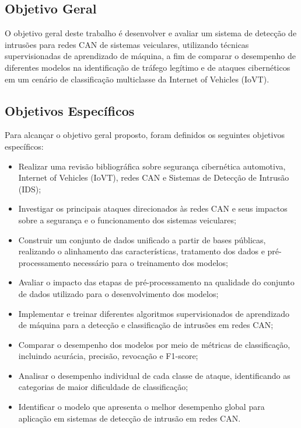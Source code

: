 \subsection{Objetivo Geral}

O objetivo geral deste trabalho é desenvolver e avaliar um sistema de detecção de intrusões para redes CAN de sistemas veiculares, utilizando técnicas supervisionadas de aprendizado de máquina, a fim de comparar o desempenho de diferentes modelos na identificação de tráfego legítimo e de ataques cibernéticos em um cenário de classificação multiclasse da Internet of Vehicles (IoVT).

\subsection{Objetivos Específicos}

Para alcançar o objetivo geral proposto, foram definidos os seguintes objetivos específicos:

\begin{itemize}

\item Realizar uma revisão bibliográfica sobre segurança cibernética automotiva, Internet of Vehicles (IoVT), redes CAN e Sistemas de Detecção de Intrusão (IDS);

\item Investigar os principais ataques direcionados às redes CAN e seus impactos sobre a segurança e o funcionamento dos sistemas veiculares;

\item Construir um conjunto de dados unificado a partir de bases públicas, realizando o alinhamento das características, tratamento dos dados e pré-processamento necessário para o treinamento dos modelos;

\item Avaliar o impacto das etapas de pré-processamento na qualidade do conjunto de dados utilizado para o desenvolvimento dos modelos;

\item Implementar e treinar diferentes algoritmos supervisionados de aprendizado de máquina para a detecção e classificação de intrusões em redes CAN;

\item Comparar o desempenho dos modelos por meio de métricas de classificação, incluindo acurácia, precisão, revocação e F1-score;

\item Analisar o desempenho individual de cada classe de ataque, identificando as categorias de maior dificuldade de classificação;

\item Identificar o modelo que apresenta o melhor desempenho global para aplicação em sistemas de detecção de intrusão em redes CAN.

\end{itemize}

